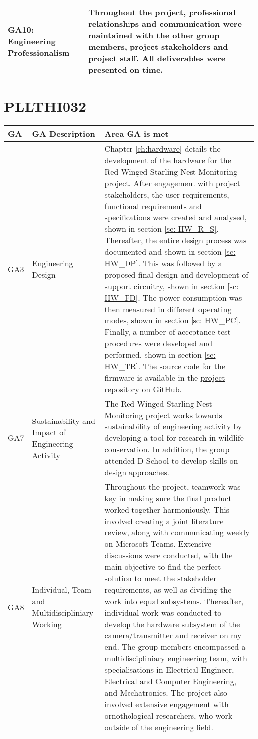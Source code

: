 \documentclass[class=report,11pt,crop=false]{standalone}
\begin{document}
\begin{tabularx}{\textwidth}{|p{} X|}
    GA10: Engineering Professionalism & Throughout the project, professional relationships and communication were maintained with the other group members, project stakeholders and project staff. All deliverables were presented on time. \\ \hline


\end{tabularx}
\raggedright


\section{PLLTHI032}

\centering
\begin{tabularx}{\textwidth}{|p{} p{} X|}

    \hline
    \textbf{GA} & \textbf{GA Description} & \textbf{Area GA is met} \\ \hline

    GA3 & Engineering Design & Chapter \ref{ch:hardware} details the development of the hardware for the Red-Winged Starling Nest Monitoring project. After engagement with project stakeholders, the user requirements, functional requirements and specifications were created and analysed, shown in section \ref{sc: HW_R_S}. Thereafter, the entire design process was documented and shown in section \ref{sc: HW_DP}. This was followed by a proposed final design and development of support circuitry, shown in section \ref{sc: HW_FD}. The power consumption was then measured in different operating modes, shown in section \ref{sc: HW_PC}. Finally, a number of acceptance test procedures were developed and performed, shown in section \ref{sc: HW_TR}. The source code for the firmware is available in the \href{https://github.com/rothdu/EEE4113F-Group13-2024}{project repository} on GitHub.   \\ \hline

    GA7 & Sustainability and Impact of Engineering Activity & The Red-Winged Starling Nest Monitoring project works towards sustainability of engineering activity by developing a tool for research in wildlife conservation.  In addition, the group attended D-School to develop skills on design approaches.  \\ \hline

    GA8 & Individual, Team and Multidiscipliniary Working & Throughout the project, teamwork was key in making sure the final product worked together harmoniously. This involved creating a joint literature review, along with communicating weekly on Microsoft Teams. Extensive discussions were conducted, with the main objective to find the perfect solution to meet the stakeholder requirements, as well as dividing the work into equal subsystems. Thereafter, individual work was conducted to develop the hardware subsystem of the camera/transmitter and receiver on my end. The group members encompassed a multidiscipliniary engineering team, with specialisations in Electrical Engineer, Electrical and Computer Engineering, and Mechatronics. The project also involved extensive engagement with ornothological researchers, who work outside of the engineering field. \\ \hline


\end{tabularx}
\end{document}
